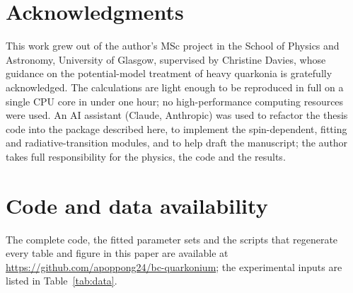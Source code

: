 \documentclass[10pt,twocolumn]{article}
\newenvironment{acknowledgments}{\section*{Acknowledgments}}{}
\begin{document}
\begin{acknowledgments}
This work grew out of the author's MSc project in the School of Physics and Astronomy, University of Glasgow, supervised by Christine Davies, whose guidance on the potential-model treatment of heavy quarkonia is gratefully acknowledged.
The calculations are light enough to be reproduced in full on a single CPU core in under one hour; no high-performance computing resources were used.
An AI assistant (Claude, Anthropic) was used to refactor the thesis code into the package described here, to implement the spin-dependent, fitting and radiative-transition modules, and to help draft the manuscript; the author takes full responsibility for the physics, the code and the results.
\end{acknowledgments}

\section*{Code and data availability}
The complete code, the fitted parameter sets and the scripts that regenerate every table and figure in this paper are available at \url{https://github.com/apoppong24/bc-quarkonium}; the experimental inputs are listed in Table~\ref{tab:data}.



\end{document}
